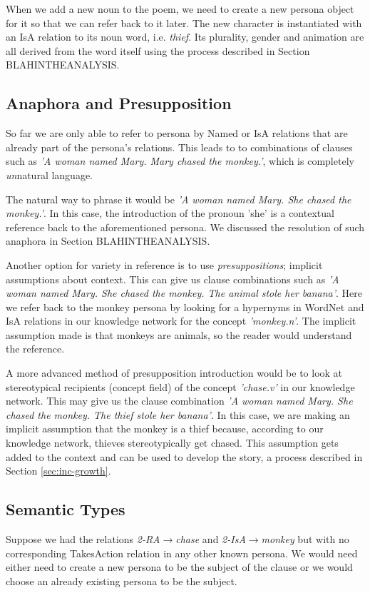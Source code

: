 When we add a new noun to the poem, we need to create a new persona object for it so that we can refer back to it later. The new character is instantiated with an IsA relation to its noun word, i.e. \textit{thief}. Its plurality, gender and animation are all derived from the word itself using the process described in Section BLAHINTHEANALYSIS.

\subsection{Anaphora and Presupposition}
So far we are only able to refer to persona by Named or IsA relations that are already part of the persona's relations. This leads to to combinations of clauses such as \textit{'A woman named Mary. Mary chased the monkey.'}, which is completely \textit{un}natural language.

The natural way to phrase it would be \textit{'A woman named Mary. She chased the monkey.'}. In this case, the introduction of the pronoun 'she' is a contextual reference back to the aforementioned persona. We discussed the resolution of such anaphora in Section BLAHINTHEANALYSIS.

Another option for variety in reference is to use \textit{presuppositions}; implicit assumptions about context. This can give us clause combinations such as \textit{'A woman named Mary. She chased the monkey. The animal stole her banana'}. Here we refer back to the monkey persona by looking for a hypernyms in WordNet and IsA relations in our knowledge network for the concept \textit{'monkey.n'}. The implicit assumption made is that monkeys are animals, so the reader would understand the reference.

A more advanced method of presupposition introduction would be to look at stereotypical recipients (concept field) of the concept \textit{'chase.v'} in our knowledge network. This may give us the clause combination \textit{'A woman named Mary. She chased the monkey. The thief stole her banana'}. In this case, we are making an implicit assumption that the monkey is a thief because, according to our knowledge network, thieves stereotypically get chased. This assumption gets added to the context and can be used to develop the story, a process described in Section \ref{sec:inc-growth}.

\subsection{Semantic Types}
\label{sec:sem-type} 
Suppose we had the relations \textit{2-RA$\rightarrow$chase} and \textit{2-IsA$\rightarrow$monkey} but with no corresponding TakesAction relation in any other known persona. We would need either need to create a new persona to be the subject of the clause or we would choose an already existing persona to be the subject.

